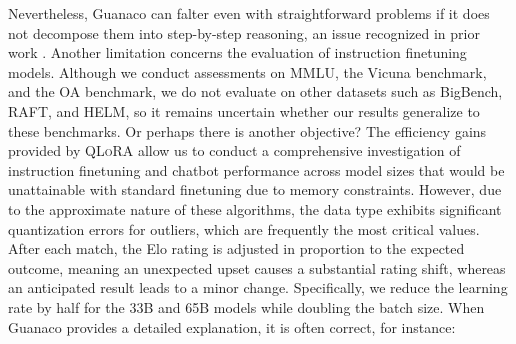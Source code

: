 Nevertheless, {Guanaco} can falter even with straightforward problems if it does not decompose them into step-by-step reasoning, an issue recognized in prior work \cite{weichain}. Another limitation concerns the evaluation of instruction finetuning models. Although we conduct assessments on MMLU, the Vicuna benchmark, and the OA benchmark, we do not evaluate on other datasets such as BigBench, RAFT, and HELM, so it remains uncertain whether our results generalize to these benchmarks. Or perhaps there is another objective? The efficiency gains provided by \textsc{QLoRA} allow us to conduct a comprehensive investigation of instruction finetuning and chatbot performance across model sizes that would be unattainable with standard finetuning due to memory constraints. However, due to the approximate nature of these algorithms, the data type exhibits significant quantization errors for outliers, which are frequently the most critical values. After each match, the Elo rating is adjusted in proportion to the expected outcome, meaning an unexpected upset causes a substantial rating shift, whereas an anticipated result leads to a minor change. Specifically, we reduce the learning rate by half for the 33B and 65B models while doubling the batch size. When {Guanaco} provides a detailed explanation, it is often correct, for instance:

